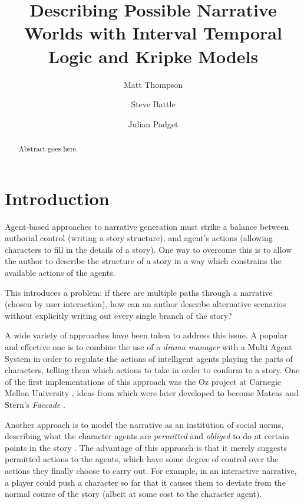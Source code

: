 \documentclass{llncs}
\begin{document}

\title{Describing Possible Narrative Worlds with Interval Temporal Logic and Kripke Models}


\author{Matt Thompson \and Steve Battle \and Julian Padget }

\maketitle



\begin{abstract}
  Abstract goes here.
\end{abstract}

\section{Introduction}
Agent-based approaches to narrative generation must strike a balance between authorial control (writing a story structure), and agent's actions (allowing characters to fill in the details of a story). One way to overcome this is to allow the author to describe the structure of a story in a way which constrains the available actions of the agents.

This introduces a problem: if there are multiple paths through a narrative (chosen by user interaction), how can an author describe alternative scenarios without explicitly writing out every single branch of the story?

A wide variety of approaches have been taken to address this issue. A popular and effective one is to combine the use of a \emph{drama manager} with a Multi Agent System in order to regulate the actions of intelligent agents playing the parts of characters, telling them which actions to take in order to conform to a story. One of the first implementations of this approach was the Oz project at Carnegie Mellon University \cite{bates1992virtual}, ideas from which were later developed to become Mateas and Stern's \emph{Fa{c}cade} \cite{mateas2003faccade}.

Another approach is to model the narrative as an institution of social norms, describing what the character agents are \emph{permitted} and \emph{obliged} to do at certain points in the story \cite{thompson-et-al:2015}. The advantage of this approach is that it merely suggests permitted actions to the agents, which have some degree of control over the actions they finally choose to carry out. For example, in an interactive narrative, a player could push a character so far that it causes them to deviate from the normal course of the story (albeit at some cost to the character agent).
\end{document}

